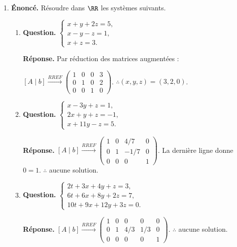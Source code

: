 \documentclass[12pt, a4paper]{article}
\begin{document}
\begin{enumerate}[label=3.\arabic*., start=25]
\begin{minipage}[t]{\linewidth}
\begin{enumerate}[\arabic*.]
\end{enumerate}
\end{minipage}

  \item \begin{minipage}[t]{\linewidth}\raggedright
\textbf{Énoncé.} Résoudre dans $\RR$ les systèmes suivants.
\begin{enumerate}[label=\arabic*.,start=1]
\item \textbf{Question.} $\displaystyle\begin{cases}x+y+2z=5,\\x-y-z=1,\\x+z=3.\end{cases}$
\par\smallskip
\textbf{Réponse.} Par réduction des matrices augmentées :

$\displaystyle [A\mid b]\xrightarrow{RREF}\begin{pmatrix}1&0&0&3\\0&1&0&2\\0&0&1&0\end{pmatrix}$.
        $\therefore (x,y,z)=(3,2,0)$.

\item \textbf{Question.} $\displaystyle\begin{cases}x-3y+z=1,\\2x+y+z=-1,\\x+11y-z=5.\end{cases}$
\par\smallskip
\textbf{Réponse.} $\displaystyle [A\mid b]\xrightarrow{RREF}\begin{pmatrix}1&0&4/7&0\\0&1&-1/7&0\\0&0&0&1\end{pmatrix}$.
        La dernière ligne donne $0=1$. $\therefore$ aucune solution.

\item \textbf{Question.} $\displaystyle\begin{cases}2t+3x+4y+z=3,\\6t+6x+8y+2z=7,\\10t+9x+12y+3z=0.\end{cases}$
\par\smallskip
\textbf{Réponse.} $\displaystyle [A\mid b]\xrightarrow{RREF}\begin{pmatrix}1&0&0&0&0\\0&1&4/3&1/3&0\\0&0&0&0&1\end{pmatrix}$.
        $\therefore$ aucune solution.


\end{enumerate}
\end{minipage}
\end{enumerate}
\end{document}
